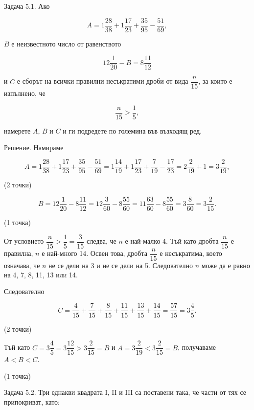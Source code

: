 
Задача 5.1. Ако

$$A=1\dfrac{28}{38}+1\dfrac{17}{23}+\dfrac{35}{95}-\dfrac{51}{69},$$

$B$ е неизвестното число от равенството

$$12\dfrac{1}{20}-B=8\dfrac{11}{12}$$

и $C$ е сборът на всички правилни несъкратими дроби от вида $\dfrac{n}{15}$, за които е изпълнено, че

$$\dfrac{n}{15}>\dfrac{1}{5},$$

намерете $A$, $B$ и $C$ и ги подредете по големина във възходящ ред.

Решение. Намираме

$$A=1\dfrac{28}{38}+1\dfrac{17}{23}+\dfrac{35}{95}-\dfrac{51}{69}=1\dfrac{14}{19}+1\dfrac{17}{23}+\dfrac{7}{19}-\dfrac{17}{23}=2\dfrac{2}{19}+1=3\dfrac{2}{19},$$

(2 точки)

$$B=12\dfrac{1}{20}-8\dfrac{11}{12}=12\dfrac{3}{60}-8\dfrac{55}{60}=11\dfrac{63}{60}-8\dfrac{55}{60}=3\dfrac{8}{60}=3\dfrac{2}{15}.$$

(1 точка)

От условието $\dfrac{n}{15}>\dfrac{1}{5}=\dfrac{3}{15}$ следва, че $n$ е най-малко 4. Тъй като дробта $\dfrac{n}{15}$ е правилна, $n$ е най-много 14. Освен това, дробта $\dfrac{n}{15}$ е несъкратима, което означава, че $n$ не се дели на 3 и не се дели на 5. Следователно $n$ може да е равно на 4, 7, 8, 11, 13 или 14.

Следователно

$$C=\dfrac{4}{15}+\dfrac{7}{15}+\dfrac{8}{15}+\dfrac{11}{15}+\dfrac{13}{15}+\dfrac{14}{15}=\dfrac{57}{15}=3\dfrac{4}{5}.$$

(2 точки)

Тъй като $C=3\dfrac{4}{5}=3\dfrac{12}{15}>3\dfrac{2}{15}=B$ и $A=3\dfrac{2}{19}<3\dfrac{2}{15}=B$, получаваме $A<B<C$.

(1 точка)

Задача 5.2. Три еднакви квадрата I, II и III са поставени така, че части от тях се припокриват, като:

